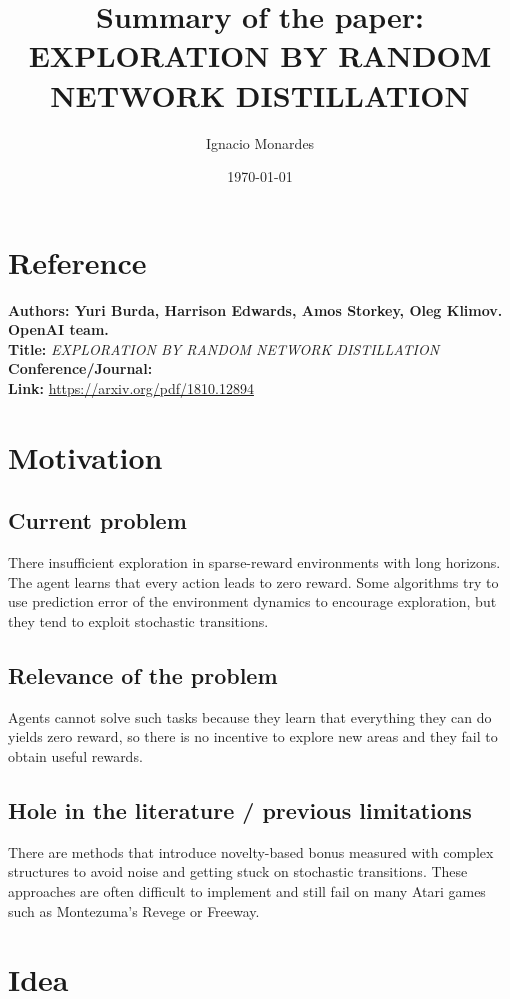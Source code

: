 \documentclass[11pt,a4paper]{article}
\title{\textbf{Summary of the paper:}\\
\large EXPLORATION BY RANDOM NETWORK DISTILLATION}
\author{Ignacio Monardes}
\date{\today}
\begin{document}
\maketitle

\section*{Reference}
\noindent
\textbf{Authors: Yuri Burda, Harrison Edwards, Amos Storkey, Oleg Klimov. OpenAI team.}  \\
\textbf{Title:} \textit{EXPLORATION BY RANDOM NETWORK DISTILLATION} \\
\textbf{Conference/Journal:}  \\
\textbf{Link:} \url{https://arxiv.org/pdf/1810.12894}


\section{Motivation}
\subsection{Current problem} 
There insufficient exploration in sparse-reward environments with long horizons. The agent learns that every action leads to zero reward.  
Some algorithms try to use prediction error of the environment dynamics to encourage exploration, but they tend to exploit stochastic transitions.

\subsection{Relevance of the problem}
Agents cannot solve such tasks because they learn that everything they can do yields zero reward, so there is no incentive 
to explore new areas and they fail to obtain useful rewards. 

\subsection{Hole in the literature / previous limitations}
There are methods that introduce novelty-based bonus measured with complex structures to avoid noise and getting stuck on stochastic transitions. 
These approaches are often difficult to implement and still fail on many Atari games such as Montezuma's Revege or Freeway. 

\section{Idea}
\end{document}
